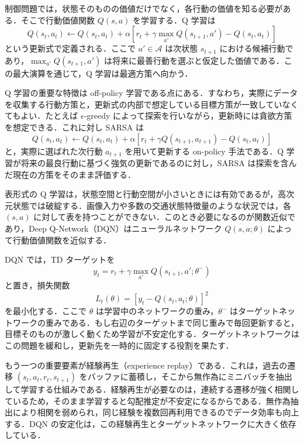 制御問題では，状態そのものの価値だけでなく，各行動の価値を知る必要がある．そこで行動価値関数 $Q(s,a)$ を学習する．Q 学習は
\begin{equation*}
Q(s_t,a_t) \leftarrow Q(s_t,a_t) + \alpha \left[r_t + \gamma \max_{a'} Q(s_{t+1},a') - Q(s_t,a_t)\right]
\end{equation*}
という更新式で定義される\cite{WatkinsDayan1992}．ここで $a' \in \mathcal{A}$ は次状態 $s_{t+1}$ における候補行動であり，$\max_{a'} Q(s_{t+1},a')$ は将来に最善行動を選ぶと仮定した価値である．この最大演算を通じて，Q 学習は最適方策へ向かう．

Q 学習の重要な特徴は off-policy 学習である点にある．すなわち，実際にデータを収集する行動方策と，更新式の内部で想定している目標方策が一致していなくてもよい．たとえば $\epsilon$-greedy によって探索を行いながら，更新時には貪欲方策を想定できる．これに対し SARSA は
\begin{equation*}
Q(s_t,a_t)
\leftarrow
Q(s_t,a_t) + \alpha
\left[
r_t + \gamma Q(s_{t+1},a_{t+1}) - Q(s_t,a_t)
\right]
\end{equation*}
と，実際に選ばれた次行動 $a_{t+1}$ を用いて更新する on-policy 手法である．Q 学習が将来の最良行動に基づく強気の更新であるのに対し，SARSA は探索を含んだ現在の方策をそのまま評価する．

表形式の Q 学習は，状態空間と行動空間が小さいときには有効であるが，高次元状態では破綻する．画像入力や多数の交通状態特徴量のような状況では，各 $(s,a)$ に対して表を持つことができない．このとき必要になるのが関数近似であり，Deep Q-Network（DQN）はニューラルネットワーク $Q(s,a;\theta)$ によって行動価値関数を近似する\cite{Mnih2015}．

DQN では，TD ターゲットを
\begin{equation*}
y_t = r_t + \gamma \max_{a'} Q(s_{t+1},a';\theta^-)
\end{equation*}
と置き，損失関数
\begin{equation*}
L_t(\theta)
=
\left[
y_t - Q(s_t,a_t;\theta)
\right]^2
\end{equation*}
を最小化する．ここで $\theta$ は学習中のネットワークの重み，$\theta^-$ はターゲットネットワークの重みである．もし右辺のターゲットまで同じ重みで毎回更新すると，目標そのものが激しく動くため学習が不安定化する．ターゲットネットワークはこの問題を緩和し，更新先を一時的に固定する役割を果たす．

もう一つの重要要素が経験再生（experience replay）である．これは，過去の遷移 $(s_t,a_t,r_t,s_{t+1})$ をバッファに蓄積し，そこから無作為にミニバッチを抽出して学習する仕組みである．経験再生が必要なのは，連続する遷移が強く相関しているため，そのまま学習すると勾配推定が不安定になるからである．無作為抽出により相関を弱められ，同じ経験を複数回再利用できるのでデータ効率も向上する．DQN の安定化は，この経験再生とターゲットネットワークに大きく依存している．

